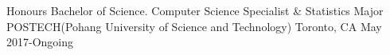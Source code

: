 

\begin{cventries}

  \cventry
    {Honours Bachelor of Science. Computer Science Specialist & Statistics Major} %
    {POSTECH(Pohang University of Science and Technology)} %
    {Toronto, CA} %
    {May 2017-Ongoing} %
    {}

\end{cventries}
